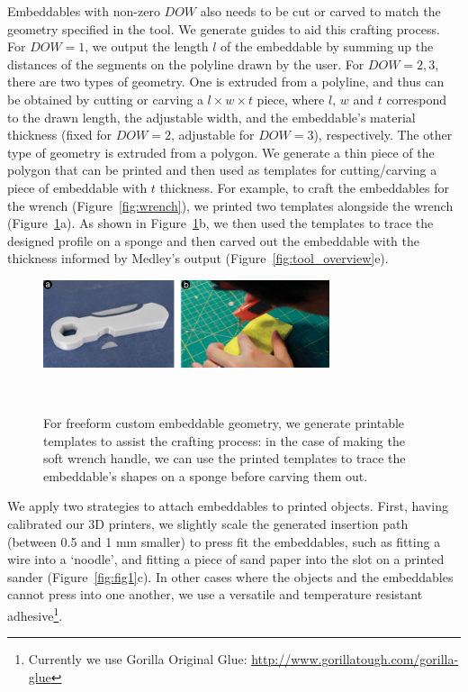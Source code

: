 Embeddables with non-zero $DOW$ also needs to be cut or carved to match the geometry specified in the tool. We generate guides to aid this crafting process. For $DOW=1$, we output the length $l$ of the embeddable by summing up the distances of the segments on the polyline drawn by the user. For $DOW=2, 3$, there are two types of geometry. One is extruded from a polyline, and thus can be obtained by cutting or carving a $l \times w \times t$ piece, where $l$, $w$ and $t$ correspond to the drawn length, the adjustable width, and the embeddable's material thickness (fixed for $DOW=2$, adjustable for $DOW=3$), respectively. The other type of geometry is extruded from a polygon. We generate a thin piece of the polygon that can be printed and then used as templates for cutting/carving a piece of embeddable with $t$ thickness. For example, to craft the embeddables for the wrench (Figure~\ref{fig:wrench}), we printed two templates alongside the wrench (Figure~\ref{fig:template}a). As shown in Figure~\ref{fig:template}b, we then used the templates to trace the designed profile on a sponge and then carved out the embeddable with the thickness informed by Medley's output (Figure~\ref{fig:tool_overview}e).

\begin{figure} [h]
  \centering
  \includegraphics[width=0.75\textwidth]{figures/template}
  \caption{For freeform custom embeddable geometry, we generate printable templates to assist the crafting process: in the case of making the soft wrench handle, we can use the printed templates to trace the embeddable's shapes on a sponge before carving them out.}~\label{fig:template}
\end{figure}

We apply two strategies to attach embeddables to printed objects. First, having calibrated our 3D printers, we slightly scale the generated insertion path (between 0.5 and 1 mm smaller) to press fit the embeddables, such as fitting a wire into a `noodle', and fitting a piece of sand paper into the slot on a printed sander (Figure~\ref{fig:fig1}c). In other cases where the objects and the embeddables cannot press into one another, we use a versatile and temperature resistant adhesive\footnote{Currently we use Gorilla Original Glue: \url{http://www.gorillatough.com/gorilla-glue}}.

